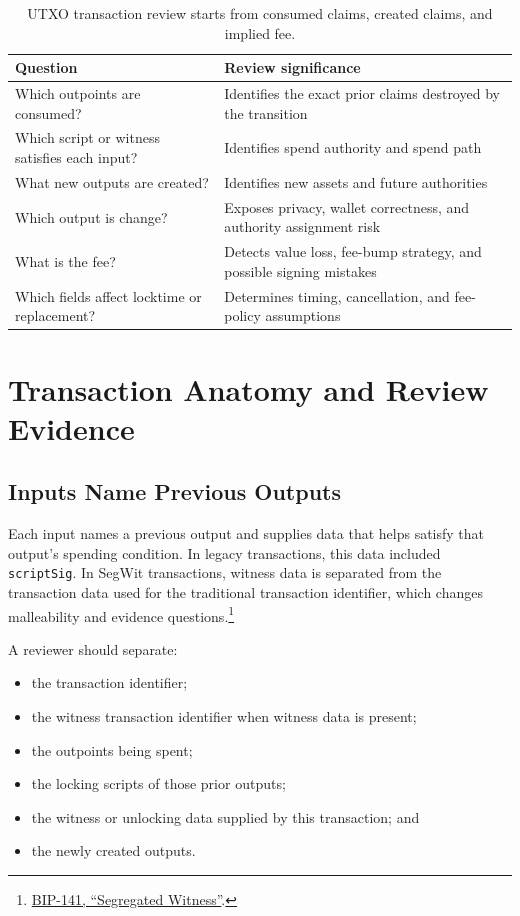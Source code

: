 \begin{table}[htbp]
\centering
\small
\renewcommand{\arraystretch}{1.18}
\begin{tabularx}{\textwidth}{@{}>{\RaggedRight\arraybackslash}p{}X@{}}
\toprule
Question & Review significance \\
\midrule
Which outpoints are consumed? & Identifies the exact prior claims destroyed by the transition \\
Which script or witness satisfies each input? & Identifies spend authority and spend path \\
What new outputs are created? & Identifies new assets and future authorities \\
Which output is change? & Exposes privacy, wallet correctness, and authority assignment risk \\
What is the fee? & Detects value loss, fee-bump strategy, and possible signing mistakes \\
Which fields affect locktime or replacement? & Determines timing, cancellation, and fee-policy assumptions \\
\bottomrule
\end{tabularx}
\caption{UTXO transaction review starts from consumed claims, created claims, and implied fee.}
\end{table}

\section{Transaction Anatomy and Review Evidence}

\subsection{Inputs Name Previous Outputs}

Each input names a previous output and supplies data that helps satisfy that output's spending condition. In legacy transactions, this data included \texttt{scriptSig}. In SegWit transactions, witness data is separated from the transaction data used for the traditional transaction identifier, which changes malleability and evidence questions.\footnote{\href{https://github.com/bitcoin/bips/blob/master/bip-0141.mediawiki}{BIP-141, ``Segregated Witness''}.}

A reviewer should separate:

\begin{itemize}
\item the transaction identifier;
\item the witness transaction identifier when witness data is present;
\item the outpoints being spent;
\item the locking scripts of those prior outputs;
\item the witness or unlocking data supplied by this transaction; and
\item the newly created outputs.
\end{itemize}


